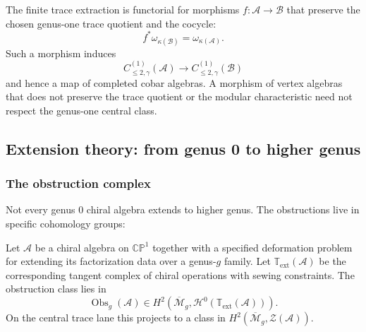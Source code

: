 \begin{remark}[Functoriality]
The finite trace extraction is functorial for morphisms
$f\colon\mathcal{A}\to\mathcal{B}$ that preserve the chosen genus-one
trace quotient and the cocycle:
\[
f^*\omega_{\kappa(\mathcal B)}=\omega_{\kappa(\mathcal A)}.
\]
Such a morphism induces
\[
C_{\le2,\gamma}^{(1)}(\mathcal{A})
\longrightarrow
C_{\le2,\gamma}^{(1)}(\mathcal{B})
\]
and hence a map of completed cobar algebras. A morphism of vertex
algebras that does not preserve the trace quotient or the modular
characteristic need not respect the genus-one central class.
\end{remark}

\subsection{Extension theory: from genus 0 to higher genus}

\subsubsection{The obstruction complex}

Not every genus 0 chiral algebra extends to higher genus. The obstructions live in specific cohomology groups:

\begin{theorem}
\label{thm:extension-obstruction-bar}
Let $\mathcal{A}$ be a chiral algebra on $\mathbb{CP}^1$ together with
a specified deformation problem for extending its factorization data
over a genus-$g$ family. Let
$\mathbb T_{\mathrm{ext}}(\mathcal A)$ be the corresponding tangent
complex of chiral operations with sewing constraints. The obstruction
class lies in
\[
\operatorname{Obs}_g(\mathcal{A})
\in
H^2\!\left(\overline{\mathcal{M}}_g,
\mathcal H^0(\mathbb T_{\mathrm{ext}}(\mathcal A))\right).
\]
On the central trace lane this projects to a class in
$H^2(\overline{\mathcal{M}}_g,\mathcal Z(\mathcal A))$.
\end{theorem}

